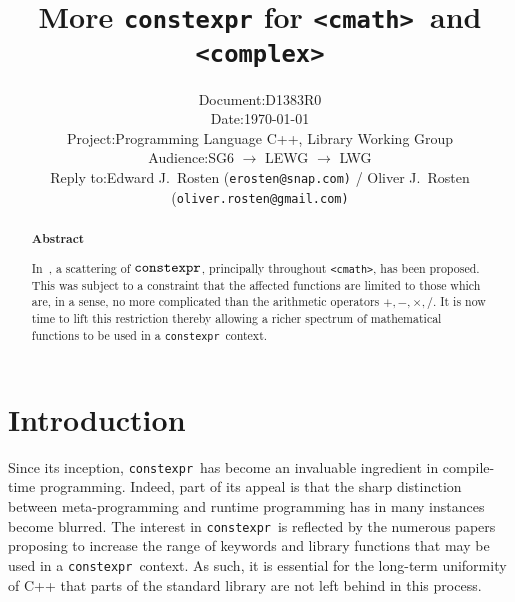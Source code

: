 \documentclass[prd,twocolumn,amsmath,amssymb,nofootinbib,eqsecnum]{revtex4-1}
\newcommand{\constexpr}{\code{constexpr}\xspace}
\newcommand{\code}[1]{{\tt #1}}
\newcommand{\header}[1]{{\tt <#1>}}
\newcommand{\cmath}{\header{cmath}}
\newcommand{\complex}{\header{complex}}
\newcommand{\Operators}{\ensuremath{+,-,\times,/}}
\begin{document}
\title{More \constexpr for \cmath\ and \complex}

\author{
\hspace{11.5em}
\begin{tabular}{ll}
	Document: & D1383R0
\\
	Date: & \today
\\
	Project: & Programming Language C++, Library Working Group
\\
	Audience: & SG6 $\rightarrow$ LEWG $\rightarrow$ LWG
\\
	Reply to: & Edward J.\ Rosten {(\tt erosten@snap.com)}
 / Oliver J.\ Rosten {(\tt oliver.rosten@gmail.com)}
\end{tabular}
}

\begin{abstract}

\begin{center} {\bf Abstract} \end{center}

In~\cite{Rosten-constexpr}, a scattering of $\constexpr$, principally throughout \cmath, has been proposed. This was subject to a constraint that the affected functions are limited to those which are, in a sense, no more complicated than the arithmetic operators \Operators. It is now time to lift this restriction thereby allowing a richer spectrum of mathematical functions to be used in a \constexpr\ context.
	
\end{abstract}


\maketitle

\tableofcontents

\section{Introduction}

Since its inception, \constexpr\ has become an invaluable ingredient in compile-time programming. Indeed, part of its appeal is that the sharp distinction between meta-programming and runtime programming has in many instances become blurred. The interest in \constexpr\ is reflected by the numerous papers proposing to increase the range of keywords and library functions that may be used in a \constexpr\ context. As such, it is essential for the long-term uniformity of C++ that parts of the standard library are not left behind in this process.
\end{document}
